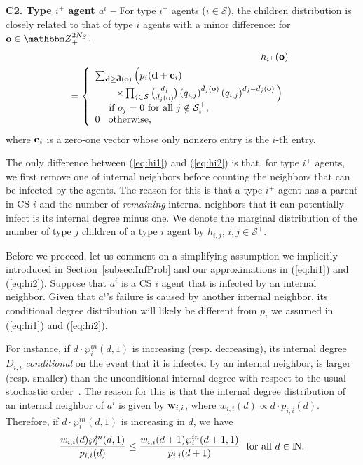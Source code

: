 \documentclass[10pt, journal, compsoc]{IEEEtran}
\newcommand {\cS}{{\mathcal{S}}}
\newcommand {\bd} {{\bf d}}
\newcommand {\be} {{\bf e}}
\newcommand {\bo} {{\bf o}}
\newcommand {\Z} {{\mathbbm Z}}
\newcommand {\N} {{\rm I\kern-1.5pt N}}
\newcommand{\beqa}{\begin{eqnarray}}
\newcommand{\eeqa}{\end{eqnarray}}
\newcommand{\beqan}{\begin{eqnarray*}}
\newcommand{\eeqan}{\end{eqnarray*}}
\newcommand{\myeq}{& \hspace{-0.1in} = & \hspace{-0.1in}}
\newcommand{\lb}{\nonumber \\}
\newcommand{\myhb}{\hspace{-0.3in}}
\newcommand{\myhf}{\hspace{0.3in}}
\newcommand{\myskip}{\\ \vspace{-0.1in}}
\begin{document}
{\bf C2. Type $i^+$ agent $a^i$ --}
For type $i^+$ agents ($i \in \cS$), the 
children distribution is closely related to that of 
type $i$ agents with a minor difference: for ${\bf o}
\in \Z_+^{2 N_S}$,
\beqa
&& \myhb h_{i^+}({\bf o}) 
	\label{eq:hi2} \\
\myeq \left\{ \begin{array}{l}
	\sum_{\bd \geq \bar{\bd}({\bf o})} 
	\Big( p_{i}(\bd + \be_i) \\
	\myhf \times \prod_{j \in \cS} 
		{{d_j}\choose{\bar{d}_j(\bo)}} 
			\left( q_{i,j} \right)^{\bar{d}_j(\bo)}
			\left( \bar{q}_{i,j} \right)^{d_j 
				- \bar{d}_j(\bo)} \Big) \lb
	\hspace{0.15in} \mbox{ if } o_j = 0
	\mbox{ for all } j \notin \cS^+_i, \\
	0 \hspace{0.12in} \mbox{otherwise,}
	\end{array} \right.
	\nonumber
\eeqa
where ${\bf e}_i$ is a zero-one vector whose only nonzero
entry is the $i$-th entry.

The only difference between (\ref{eq:hi1})
and (\ref{eq:hi2}) is that, for type $i^+$ agents, 
we first remove one of
internal neighbors before counting the
neighbors that can be infected by the agents. 
The reason for this is that a type $i^+$ 
agent has a parent in CS $i$ and the number of 
{\em remaining} internal neighbors that it can 
potentially infect is its internal degree minus one.
We denote the marginal distribution of the number 
of type $j$ children of a type $i$ agent by $h_{i,j}$, 
$i, j \in \cS^+$. 
\myskip

Before we proceed, let us comment on a simplifying 
assumption we implicitly introduced in 
Section~\ref{subsec:InfProb} and our 
approximations in (\ref{eq:hi1}) and (\ref{eq:hi2}).  
Suppose that $a^i$ is a CS $i$ agent that is 
infected by an internal neighbor. Given
that $a^i$'s failure is caused by another
internal neighbor, its conditional degree distribution 
will likely be different from $p_i$ we assumed in
(\ref{eq:hi1}) and (\ref{eq:hi2}). 

For instance, if $d \cdot \wp^{in}_i(d, 1)$ is increasing
(resp. decreasing), its internal degree $D_{i,i}$
{\em conditional} on the event that it is 
infected by an internal neighbor, is larger 
(resp. smaller) than the unconditional internal 
degree with respect to the usual 
stochastic order~\cite{SO}. The reason for this is
that the internal degree distribution of an internal
neighbor of $a^i$ is given by ${\bf w}_{i,i}$, 
where $w_{i,i}(d) \propto d \cdot p_{i,i}(d)$.
Therefore, if $d \cdot \wp^{in}_i(d, 1)$ is increasing
in $d$, we have 
\beqan
\frac{w_{i,i}(d) \wp^{in}_i(d, 1)}{p_{i,i}(d)}
\leq \frac{w_{i,i}(d+1) \wp^{in}_i(d+1, 1)}{p_{i,i}(d+1)}
\ \mbox{ for all } d \in \N.
\eeqan 
\end{document}
